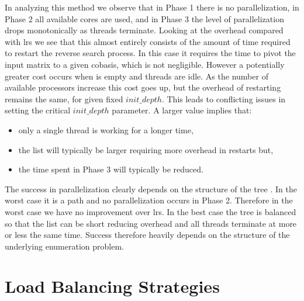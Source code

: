 \documentclass[a4paper,11pt]{article}   \usepackage{authblk} \usepackage[top=1.9cm,bottom=1.9cm,left=1.9cm,right=1.9cm]{geometry}
\newcommand{\progname}{\textsf}
\newcommand{\lrs}{\progname{lrs}\xspace}
\newcommand{\initdepth}{\ensuremath{\mathit{init\_depth}}\xspace}
\begin{document}
In analyzing this method we observe that in Phase 1 there is 
no parallelization, in Phase 2 all available cores are used, and in Phase 3
the level of parallelization drops monotonically as threads terminate.
Looking at the overhead compared with \lrs we see that
this almost entirely consists of the amount of 
time required to restart the reverse
search process. In this case it requires the time to pivot the input matrix to a given 
cobasis, which is not negligible.
However a potentially greater cost occurs when  is empty and threads are idle.
As the number of available processors increase this cost goes up, but the overhead of restarting
remains the same, for given fixed \initdepth.
This leads to conflicting issues in setting the 
critical \initdepth parameter. A larger value implies that: 
\begin{itemize}
\item
only a single thread is working for a longer
time,
\item
the list  will typically be larger requiring more overhead in restarts but,
\item
the time spent in Phase 3 will typically be reduced.
\end{itemize}

The success in parallelization clearly depends on the structure of the tree .
In the worst case it is a path and no parallelization occurs in Phase 2.
Therefore in the worst case we have no improvement  
over \lrs.
In the best case the tree is balanced so that the list  can be
short reducing overhead and all threads terminate at more or less the same time.
Success therefore heavily depends on the structure of the underlying enumeration
problem.  

\section{Load Balancing Strategies}
\end{document}
